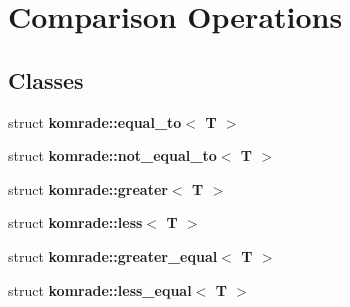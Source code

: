 \section{Comparison Operations}
\label{group__comparison__operations}
\subsection*{Classes}
\begin{CompactItemize}
\item 
struct {\bf komrade::equal\_\-to$<$ T $>$}
\item 
struct {\bf komrade::not\_\-equal\_\-to$<$ T $>$}
\item 
struct {\bf komrade::greater$<$ T $>$}
\item 
struct {\bf komrade::less$<$ T $>$}
\item 
struct {\bf komrade::greater\_\-equal$<$ T $>$}
\item 
struct {\bf komrade::less\_\-equal$<$ T $>$}
\end{CompactItemize}
